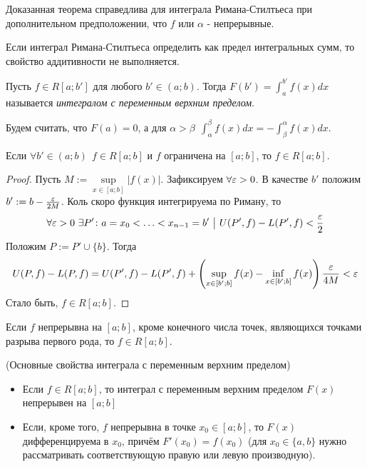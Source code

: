 \begin{note}
	Доказанная теорема справедлива для интеграла Римана-Стилтьеса при дополнительном предположении, что $f$ или $\alpha$ - непрерывные.
\end{note}

\begin{note}
	Если интеграл Римана-Стилтьеса определить как предел интегральных сумм, то свойство аддитивности не выполняется.
\end{note}

\begin{definition}
	Пусть $f \in R[a; b']$ для любого $b' \in (a; b)$. Тогда $F(b') = \int_a^{b'} f(x)dx$ называется \textit{интегралом с переменным верхним пределом}.
	
	Будем считать, что $F(a) = 0$, а для $\alpha > \beta\ \ \int_\alpha^\beta f(x)dx = -\int_\beta^\alpha f(x)dx$. 
\end{definition}

\begin{theorem}
	Если $\forall b' \in (a; b)\ \ f \in R[a; b]$ и $f$ ограничена на $[a; b]$, то $f \in R[a; b]$.
\end{theorem}

\begin{proof}
	Пусть $M := \sup\limits_{x \in [a; b]} |f(x)|$. Зафиксируем $\forall \varepsilon > 0$. В качестве $b'$ положим $b' := b - \frac{\varepsilon}{2M}$. Коль скоро функция интегрируема по Риману, то
	\[
		\forall \varepsilon > 0\ \exists P' \colon a = x_0 < \ldots < x_{n - 1} = b' \ \big|\  U(P', f) - L(P', f) < \frac{\varepsilon}{2}
	\]
	Положим $P := P' \cup \{b\}$. Тогда
	\[
		U(P, f) - L(P, f) = U(P', f) - L(P', f) + \left(\sup\limits_{x \in [b'; b]} f(x) - \inf\limits_{x \in [b'; b]} f(x)\right) \frac{\varepsilon}{4M} < \varepsilon
	\]
	Стало быть, $f \in R[a; b]$.
\end{proof}

\begin{corollary}
	Если $f$ непрерывна на $[a; b]$, кроме конечного числа точек, являющихся точками разрыва первого рода, то $f \in R[a; b]$.
\end{corollary}

\begin{theorem} (Основные свойства интеграла с переменным верхним пределом)
	\begin{itemize}
		\item Если $f \in R[a; b]$, то интеграл с переменным верхним пределом $F(x)$ непрерывен на $[a; b]$
		
		\item Если, кроме того, $f$ непрерывна в точке $x_0 \in [a; b]$, то $F(x)$ дифференцируема в $x_0$, причём $F'(x_0) = f(x_0)$ (для $x_0 \in \{a, b\}$ нужно рассматривать соответствующую правую или левую производную).
	\end{itemize}
\end{theorem}

